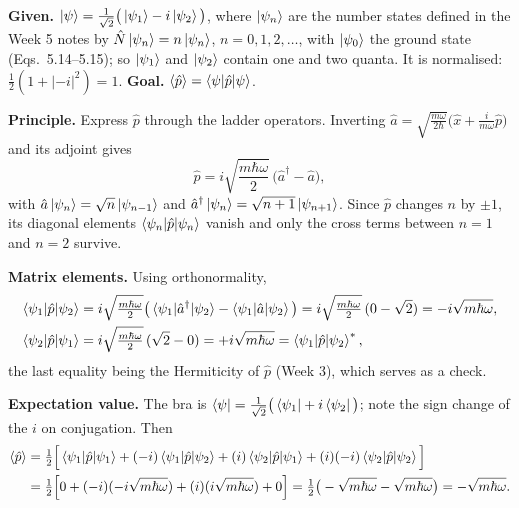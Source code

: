 \documentclass[12pt]{article}
\newif\ifsolutions
\begin{document}
\ifsolutions
\begin{solutionbox}
\textbf{Given.} $\ket{\psi}=\frac{1}{\sqrt2}\big(\ket{\psi_1}-i\ket{\psi_2}\big)$, where $\ket{\psi_n}$ are the number states defined in the Week 5 notes by $\hat N\ket{\psi_n}=n\ket{\psi_n}$, $n=0,1,2,\dots$, with $\ket{\psi_0}$ the ground state (Eqs.~5.14--5.15); so $\ket{\psi_1}$ and $\ket{\psi_2}$ contain one and two quanta. It is normalised: $\frac12(1+|{-i}|^2)=1$. \textbf{Goal.} $\langle\hat p\rangle=\braket{\psi|\hat p|\psi}$.

\textbf{Principle.} Express $\hat p$ through the ladder operators. Inverting $\hat a=\sqrt{\frac{m\omega}{2\hbar}}\big(\hat x+\frac{i}{m\omega}\hat p\big)$ and its adjoint gives
\[
\hat p=i\sqrt{\frac{m\hbar\omega}{2}}\,\big(\hat a^\dagger-\hat a\big),
\]
with $\hat a\ket{\psi_n}=\sqrt n\ket{\psi_{n-1}}$ and $\hat a^\dagger\ket{\psi_n}=\sqrt{n+1}\ket{\psi_{n+1}}$. Since $\hat p$ changes $n$ by $\pm1$, its diagonal elements $\braket{\psi_n|\hat p|\psi_n}$ vanish and only the cross terms between $n=1$ and $n=2$ survive.

\textbf{Matrix elements.} Using orthonormality,
\begin{align*}
\braket{\psi_1|\hat p|\psi_2}&=i\sqrt{\tfrac{m\hbar\omega}{2}}\big(\braket{\psi_1|\hat a^\dagger|\psi_2}-\braket{\psi_1|\hat a|\psi_2}\big)=i\sqrt{\tfrac{m\hbar\omega}{2}}\,(0-\sqrt2)=-i\sqrt{m\hbar\omega},\\
\braket{\psi_2|\hat p|\psi_1}&=i\sqrt{\tfrac{m\hbar\omega}{2}}\,(\sqrt2-0)=+i\sqrt{m\hbar\omega}=\braket{\psi_1|\hat p|\psi_2}^*,
\end{align*}
the last equality being the Hermiticity of $\hat p$ (Week 3), which serves as a check.

\textbf{Expectation value.} The bra is $\bra{\psi}=\frac{1}{\sqrt2}\big(\bra{\psi_1}+i\bra{\psi_2}\big)$; note the sign change of the $i$ on conjugation. Then
\begin{align*}
\langle\hat p\rangle
&=\tfrac12\Big[\braket{\psi_1|\hat p|\psi_1}+(-i)\braket{\psi_1|\hat p|\psi_2}+(i)\braket{\psi_2|\hat p|\psi_1}+(i)(-i)\braket{\psi_2|\hat p|\psi_2}\Big]\\
&=\tfrac12\Big[0+(-i)(-i\sqrt{m\hbar\omega})+(i)(i\sqrt{m\hbar\omega})+0\Big]
=\tfrac12\big(-\sqrt{m\hbar\omega}-\sqrt{m\hbar\omega}\big)=-\sqrt{m\hbar\omega}.
\end{align*}


\end{solutionbox}
\end{document}
